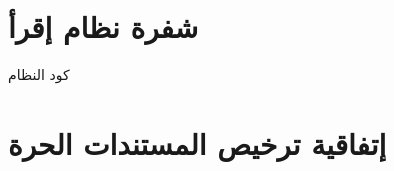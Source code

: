 \documentclass[document.tex]{subfiles}
\begin{document}
\chapter{شفرة نظام إقرأ}
كود النظام

\chapter{إتفاقية ترخيص المستندات الحرة }
\begin{english}
%
\end{english}
\end{document}
